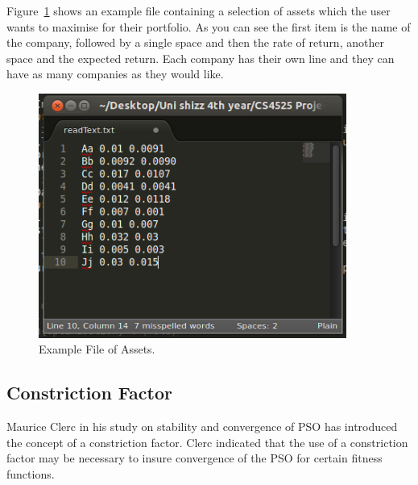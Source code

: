 \documentclass{pdfmx4020}
\begin{document}
    Figure~\ref{fig:asset_file} shows an example file containing a selection of assets which the user wants to maximise for their portfolio. As you can see the first item is the name of the company, followed by a single space and then the rate of return, another space and the expected return. Each company has their own line and they can have as many companies as they would like. 
    \begin{figure}[H]
      \centering
        \includegraphics[width=0.9\textwidth]{asset-file}
      \caption{Example File of Assets.}
      \label{fig:asset_file}
    \end{figure}
    
    \subsection{Constriction Factor} %
    \label{sub:constriction_factor}
    Maurice Clerc in his study on stability and convergence of PSO \cite{constriction_factor} has introduced the concept of a constriction factor. Clerc indicated that the use of a constriction factor may be necessary to insure convergence of the PSO for certain fitness functions.
\end{document}
